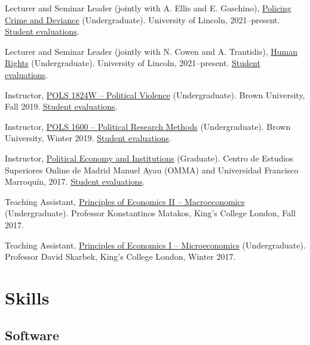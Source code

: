 \documentclass[a4paper]{article}
\renewenvironment{itemize}{
	\begin{list}{}{
			\setlength{\leftmargin}{1.5em}
		}
		}{
	\end{list}
}
\begin{document}
\begin{itemize}
\item Lecturer and Seminar Leader (jointly with A. Ellis and E. Gaschino), \href{https://blackboard.lincoln.ac.uk/ultra/courses/_182116_1/cl/outline}{Policing Crime and Deviance} (Undergraduate). University of Lincoln, 2021--present. \href{https://danilofreire.github.io/evaluations/eval-pcd-2023.xlsx}{Student evaluations}. 
\item Lecturer and Seminar Leader (jointly with N. Cowen and A. Trantidis), \href{https://blackboard.lincoln.ac.uk/ultra/courses/_184943_1/cl/outline}{Human Rights} (Undergraduate). University of Lincoln, 2021--present. \href{https://danilofreire.github.io/evaluations/eval-hr-2122.xlsx}{Student evaluations}.
\item Instructor, \href{https://danilofreire.github.io/pols1824w/}{POLS 1824W -- Political Violence} (Undergraduate). Brown University, Fall 2019. \href{https://danilofreire.github.io/evaluations/eval-pol-vio.pdf}{Student evaluations}.
\item Instructor, \href{https://pols1600.github.io/}{POLS 1600 -- Political Research Methods} (Undergraduate). Brown University, Winter 2019. \href{https://danilofreire.github.io/evaluations/eval-pol-meth.pdf}{Student evaluations}.
\item Instructor, \href{https://github.com/danilofreire/economia-politica-instituicoes-ufm}{Political Economy and Institutions} (Graduate). Centro de Estudios Superiores Online de Madrid Manuel Ayau (OMMA) and Universidad Francisco Marroquín, 2017. \href{https://danilofreire.github.io/evaluations/eval-ufm.pdf}{Student evaluations}.
\item Teaching Assistant, \href{https://github.com/danilofreire/core-econ}{Principles of Economics II -- Macroeconomics} (Undergraduate). Professor Konstantinos Matakos, King's College London, Fall 2017.
\item Teaching Assistant, \href{https://github.com/danilofreire/core-econ}{Principles of Economics I -- Microeconomics} (Undergraduate). Professor David Skarbek, King's College London, Winter 2017.
\end{itemize}

\section*{Skills}

\subsection*{Software}
\end{document}
